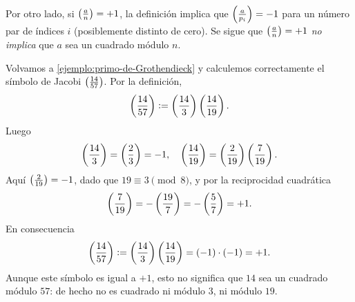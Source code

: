 \documentclass{article}
\theoremstyle{plain}
\begin{document}
Por otro lado, si $\left(\frac{a}{n}\right) = +1$, la definición implica que
$\left(\frac{a}{p_i}\right) = -1$ para un número par de índices $i$ (posiblemente
distinto de cero). Se sigue que $\left(\frac{a}{n}\right) = +1$ \emph{no implica} que $a$
sea un cuadrado módulo $n$.

\begin{ejemplo}
  Volvamos a \ref{ejemplo:primo-de-Grothendieck} y calculemos correctamente el
  símbolo de Jacobi $\left(\frac{14}{57}\right)$. Por la definición,
  $$\left(\frac{14}{57}\right) \mathrel{\mathop:}= \left(\frac{14}{3}\right)\left(\frac{14}{19}\right).$$
  Luego
  $$\left(\frac{14}{3}\right) = \left(\frac{2}{3}\right) = -1, \quad \left(\frac{14}{19}\right) = \left(\frac{2}{19}\right)\left(\frac{7}{19}\right).$$
  Aquí $\left(\frac{2}{19}\right) = -1$, dado que $19 \equiv 3 \pmod{8}$, y por la
  reciprocidad cuadrática
  $$\left(\frac{7}{19}\right) = -\left(\frac{19}{7}\right) = -\left(\frac{5}{7}\right) = +1.$$
  En consecuencia
  $$\left(\frac{14}{57}\right) \mathrel{\mathop:}= \left(\frac{14}{3}\right)\left(\frac{14}{19}\right) = (-1)\cdot (-1) = +1.$$
  Aunque este símbolo es igual a $+1$, esto no significa que $14$ sea un
  cuadrado módulo $57$: de hecho no es cuadrado ni módulo $3$, ni módulo $19$.
\end{ejemplo}
\end{document}
